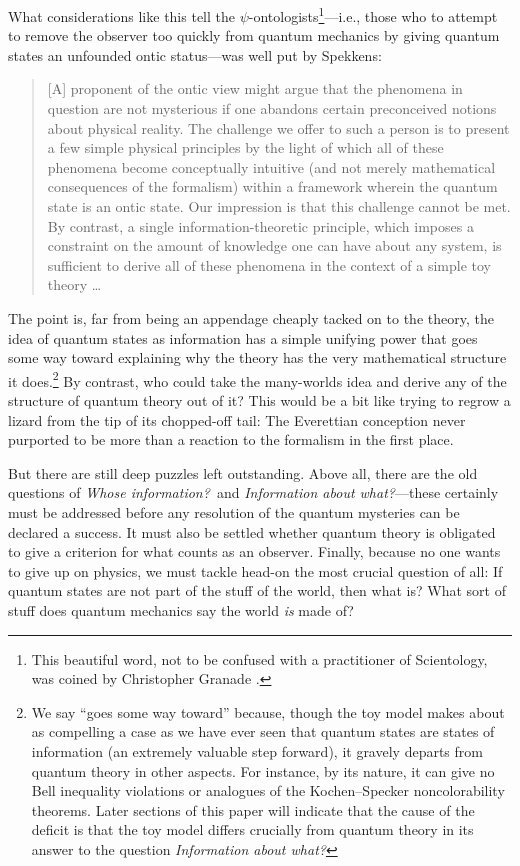 \documentclass[aps,pra,superscriptaddress,12pt,tightenlines,nofootinbib]{revtex4-2}
\begin{document}
What considerations like this tell the $\psi$-ontologists\footnote{This beautiful word, not to be confused with a practitioner of Scientology, was coined by Christopher Granade \cite{LordVoldemort}.}---i.e., those who to attempt to remove the observer too quickly from quantum mechanics by giving quantum states an unfounded ontic status---was well put by Spekkens:
\begin{quote}
[A] proponent of the ontic view might argue that the phenomena in question are not mysterious if one abandons certain preconceived notions about physical reality.  The challenge we offer to such a person is to present a few simple physical principles by the light of which all of these phenomena become conceptually intuitive (and not merely mathematical consequences of the formalism) within a framework wherein the quantum state is an ontic state. Our impression is that this challenge cannot be met.  By contrast, a single information-theoretic principle, which imposes a constraint on the amount of knowledge one can have about any system, is sufficient to derive all of these phenomena in the context of a simple toy theory \ldots
\end{quote}
The point is, far from being an appendage cheaply tacked on to the theory, the idea of quantum states as information has a simple unifying power that goes some way toward explaining why the theory has the very mathematical structure it does.\footnote{We say ``goes some way toward'' because, though the toy model makes about as compelling a case as we have ever seen that quantum states are states of information (an extremely valuable step forward), it gravely departs from quantum theory in other aspects. For instance, by its nature, it can give no Bell inequality violations or analogues of the Kochen--Specker noncolorability theorems.  Later sections of this paper will indicate that the cause of the deficit is that the toy model differs crucially from quantum theory in its answer to the question {\it Information about what?}}  By contrast, who could take the many-worlds idea and derive any of the structure of quantum theory out of it?  This would be a bit like trying to regrow a lizard from the tip of its chopped-off tail:  The Everettian conception never purported to be more than a reaction to the formalism in the first place.

But there are still deep puzzles left outstanding.  Above all, there are the old questions of {\it Whose information?}\ and {\it Information about what?}---these certainly must be addressed before any resolution of the quantum mysteries can be declared a success.  It must also be settled whether quantum theory is obligated to give a criterion for what counts as an observer.  Finally, because no one wants to give up on physics, we must tackle head-on the most crucial question of all:  If quantum states are not part of the stuff of the world, then what is?  What sort of stuff does quantum mechanics say the world {\it is\/} made of?
\end{document}
